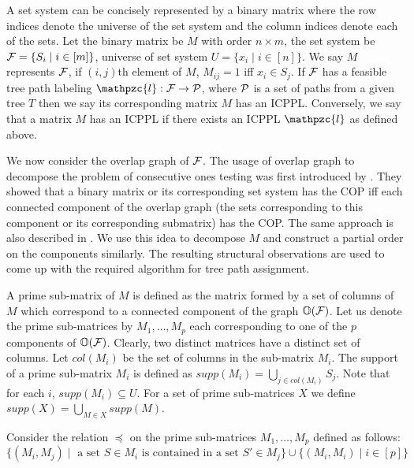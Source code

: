 \documentclass{fsttcs}
\def\cA{{\cal A}}
\def\cF{{\cal F}}
\def\cP{{\cal P}}
\def\bO{\mathbb O}
\def\cl{\mathpzc{l}}
\begin{document}
\noindent
A set system can be concisely represented by a binary matrix where the
row indices denote the universe of the set system and the column
indices denote each of the sets. Let the binary matrix be $M$ with
order $n \times m$, the set system be $\cF = \{S_i \mid i \in [m]\}$,
universe of set system $U = \{x_i \mid i \in [n]\}$. We say $M$ represents
$\cF$, if $(i,j)$th element of $M$, $M_{ij} =
1$ iff $x_i \in S_j$. If $\cF$ has a feasible tree path labeling $\cl:
\cF \rightarrow \cP$, where $\cP$ is a set of paths from a given tree
$T$
then we say its 
corresponding matrix $M$ has an ICPPL. 
Conversely, we say that a matrix
$M$ has an ICPPL if there exists an ICPPL $\cl$ as defined
above.

\noindent
We now consider the overlap graph of
$\cF$. The usage of overlap graph to
decompose the problem of consecutive ones testing was first introduced
by \cite{fg65}. They showed that a binary matrix or its corresponding
set system has the COP iff each connected component of the overlap
graph (the sets corresponding to this component or its corresponding
submatrix) has the COP. The same approach is also described in
\cite{wlh02,nsnrs09}. We use this idea to decompose $M$ and construct
a partial order on the components similarly. The resulting structural
observations are used to come up with the required algorithm for tree
path assignment. 

\noindent
A prime sub-matrix of $M$ is defined as the matrix formed by a set of
columns of $M$ which correspond to a connected component of the graph
$\bO(\cF)$.  Let us denote the prime sub-matrices by $M_1,\ldots,M_p$ each
corresponding to one of the $p$ components of $\bO(\cF)$. Clearly, two
distinct matrices have a distinct set of columns.  Let $col(M_i)$ be
the set of columns in the sub-matrix $M_i$.  The support of a prime
sub-matrix $M_i$ is defined as $supp(M_i) = \bigcup_{j
  \in col(M_i)}S_j$.  Note that for each $i$, $supp(M_i) \subseteq U$.
For a set of prime sub-matrices $X$ we define
$supp(X) = \bigcup_{M \in X} supp(M)$. 

\noindent
Consider the relation $\preccurlyeq$ on the prime sub-matrices $M_1,
\ldots, M_p$ defined as follows:
\begin{equation} 
\nonumber \{(M_i, M_j) \mid \text{ a set } S \in
  M_i \text{ is contained in a set } S' \in M_j\} \cup \{(M_i,M_i) \mid i \in[p]\} 
\end{equation}
\end{document}
